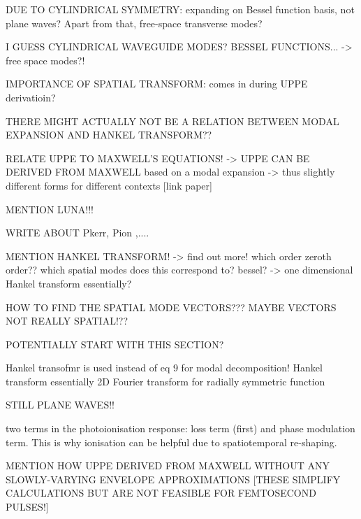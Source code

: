 \documentclass[a4paper]{jpconf}
\begin{document}
DUE TO CYLINDRICAL SYMMETRY: expanding on Bessel function basis, not plane waves? Apart from that, free-space transverse modes?

I GUESS CYLINDRICAL WAVEGUIDE MODES? BESSEL FUNCTIONS...
		-> free space modes?!
		
		IMPORTANCE OF SPATIAL TRANSFORM: comes in during UPPE derivatioin?

THERE MIGHT ACTUALLY NOT BE A RELATION BETWEEN MODAL EXPANSION AND HANKEL TRANSFORM??


RELATE UPPE TO MAXWELL'S EQUATIONS!
		-> UPPE CAN BE DERIVED FROM MAXWELL based on a modal expansion  -> thus slightly different forms for different contexts [link paper]

MENTION LUNA!!!

WRITE ABOUT Pkerr, Pion ,....

MENTION HANKEL TRANSFORM! -> find out more! which order zeroth order?? which spatial modes does this correspond to? bessel? -> one dimensional Hankel transform essentially?

HOW TO FIND THE SPATIAL MODE VECTORS???
	MAYBE VECTORS NOT REALLY SPATIAL!??

POTENTIALLY START WITH THIS SECTION?

Hankel transofmr is used instead of eq 9 for modal decomposition! Hankel transform essentially 2D Fourier transform for radially symmetric function

STILL PLANE WAVES!!


two terms in the photoionisation response: loss term (first) and phase modulation term. This is why ionisation can be helpful due to spatiotemporal re-shaping.


MENTION HOW UPPE DERIVED FROM MAXWELL WITHOUT ANY SLOWLY-VARYING ENVELOPE APPROXIMATIONS [THESE SIMPLIFY CALCULATIONS BUT ARE NOT FEASIBLE FOR FEMTOSECOND PULSES!]
\end{document}
